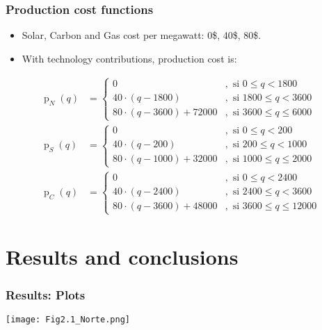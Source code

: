 \documentclass[
11pt, %
]{beamer}
\begin{document}
	\begin{frame}
		\frametitle{Production cost functions}
		
		\begin{itemize}
			\item Solar, Carbon and Gas cost per megawatt: 0\$, 40\$, 80\$.
			\item With technology contributions, production cost is:
		\end{itemize}
		
		\begin{equation*}\begin{aligned}
				\operatorname{p}_N(q)&=\left\{\begin{array}{cl}
					0 & ,\text{ si } 0\leq q<1800 \\
					40\cdot(q-1800) & ,\text{ si } 1800\leq q<3600 \\
					80\cdot(q-3600)+72000 & ,\text{ si } 3600\leq q\leq6000
				\end{array}\right. \\
				\operatorname{p}_S(q)&=\left\{\begin{array}{cl}
					0 & ,\text{ si } 0\leq q<200 \\
					40\cdot(q-200) & ,\text{ si } 200\leq q<1000 \\
					80\cdot(q-1000)+32000 & ,\text{ si } 1000\leq q\leq2000
				\end{array}\right. \\
				\operatorname{p}_C(q)&=\left\{\begin{array}{cl}
					0 & ,\text{ si } 0\leq q<2400 \\
					40\cdot(q-2400) & ,\text{ si } 2400\leq q<3600 \\
					80\cdot(q-3600)+48000 & ,\text{ si } 3600\leq q\leq12000
				\end{array}\right.
		\end{aligned}\end{equation*}
	\end{frame}
	
	\section{Results and conclusions}
	
	\begin{frame}
		\frametitle{Results: Plots}
		
		\begin{center}
			\texttt{[image: Fig2.1\_Norte.png]}
		\end{center}
		
	
	\end{frame}
	
\end{document}
